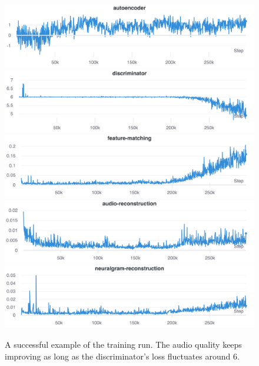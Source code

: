 \documentclass[12pt]{article}
\begin{document}
\begin{appendices}
\begin{figure}
\begin{center}
  \includegraphics[width=\textwidth]{assets/figures/loss/a}
  \includegraphics[width=\textwidth]{assets/figures/loss/d}
  \includegraphics[width=\textwidth]{assets/figures/loss/fm}
  \includegraphics[width=\textwidth]{assets/figures/loss/ar}
  \includegraphics[width=\textwidth]{assets/figures/loss/nr}
\end{center}
\caption{A successful example of the training run. The audio quality keeps improving as long as the discriminator's loss fluctuates around 6.}
\label{fig:healthy-d}
\end{figure}

\end{appendices}
\end{document}
